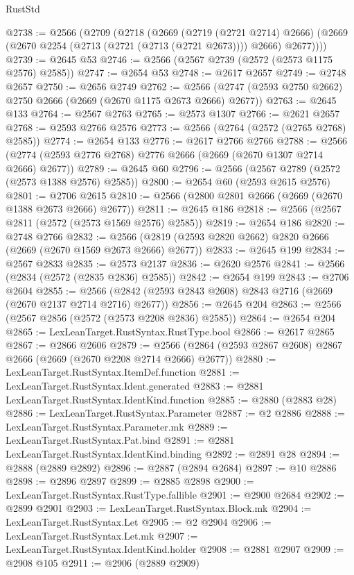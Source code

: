 \begin{lexlean}{RustStd}
\begin{coremodule}
{\begin{coremodule}
{{{{{{{{{{{{{{{{{{{{{{{{{{{{{{{{{{{{{{{{{{{{{{{{{{{{{{{{{{{{{{{{{{{{{{{{{{{{{{@2738 := @2566
    (@2709
      (@2718
        (@2669
          (@2719 (@2721 @2714) @2666)
          (@2669 (@2670 @2254 (@2713 (@2721 (@2713 (@2721 @2673)))) @2666) @2677))))
@2739 := @2645 @53
@2746 := @2566 (@2567 @2739 (@2572 (@2573 @1175 @2576) @2585))
@2747 := @2654 @53
@2748 := @2617 @2657
@2749 := @2748 @2657
@2750 := @2656 @2749
@2762 := @2566 (@2747 (@2593 @2750 @2662) @2750 @2666 (@2669 (@2670 @1175 @2673 @2666) @2677))
@2763 := @2645 @133
@2764 := @2567 @2763
@2765 := @2573 @1307
@2766 := @2621 @2657
@2768 := @2593 @2766 @2576
@2773 := @2566 (@2764 (@2572 (@2765 @2768) @2585))
@2774 := @2654 @133
@2776 := @2617 @2766 @2766
@2788 := @2566 (@2774 (@2593 @2776 @2768) @2776 @2666 (@2669 (@2670 @1307 @2714 @2666) @2677))
@2789 := @2645 @60
@2796 := @2566 (@2567 @2789 (@2572 (@2573 @1388 @2576) @2585))
@2800 := @2654 @60 (@2593 @2615 @2576)
@2801 := @2706 @2615
@2810 := @2566 (@2800 @2801 @2666 (@2669 (@2670 @1388 @2673 @2666) @2677))
@2811 := @2645 @186
@2818 := @2566 (@2567 @2811 (@2572 (@2573 @1569 @2576) @2585))
@2819 := @2654 @186
@2820 := @2748 @2766
@2832 := @2566 (@2819 (@2593 @2820 @2662) @2820 @2666 (@2669 (@2670 @1569 @2673 @2666) @2677))
@2833 := @2645 @199
@2834 := @2567 @2833
@2835 := @2573 @2137
@2836 := @2620 @2576
@2841 := @2566 (@2834 (@2572 (@2835 @2836) @2585))
@2842 := @2654 @199
@2843 := @2706 @2604
@2855 := @2566 (@2842 (@2593 @2843 @2608) @2843 @2716 (@2669 (@2670 @2137 @2714 @2716) @2677))
@2856 := @2645 @204
@2863 := @2566 (@2567 @2856 (@2572 (@2573 @2208 @2836) @2585))
@2864 := @2654 @204
@2865 := LexLeanTarget.RustSyntax.RustType.bool
@2866 := @2617 @2865
@2867 := @2866 @2606
@2879 := @2566 (@2864 (@2593 @2867 @2608) @2867 @2666 (@2669 (@2670 @2208 @2714 @2666) @2677))
@2880 := LexLeanTarget.RustSyntax.ItemDef.function
@2881 := LexLeanTarget.RustSyntax.Ident.generated
@2883 := @2881 LexLeanTarget.RustSyntax.IdentKind.function
@2885 := @2880 (@2883 @28)
@2886 := LexLeanTarget.RustSyntax.Parameter
@2887 := @2 @2886
@2888 := LexLeanTarget.RustSyntax.Parameter.mk
@2889 := LexLeanTarget.RustSyntax.Pat.bind
@2891 := @2881 LexLeanTarget.RustSyntax.IdentKind.binding
@2892 := @2891 @28
@2894 := @2888 (@2889 @2892)
@2896 := @2887 (@2894 @2684)
@2897 := @10 @2886
@2898 := @2896 @2897
@2899 := @2885 @2898
@2900 := LexLeanTarget.RustSyntax.RustType.fallible
@2901 := @2900 @2684
@2902 := @2899 @2901
@2903 := LexLeanTarget.RustSyntax.Block.mk
@2904 := LexLeanTarget.RustSyntax.Let
@2905 := @2 @2904
@2906 := LexLeanTarget.RustSyntax.Let.mk
@2907 := LexLeanTarget.RustSyntax.IdentKind.holder
@2908 := @2881 @2907
@2909 := @2908 @105
@2911 := @2906 (@2889 @2909)
}}}}}}}}}}}}}}}}}}}}}}}}}}}}}}}}}}}}}}}}}}}}}}}}}}}}}}}}}}}}}}}}}}}}}}}}}}}}}}
\end{coremodule}}
\end{coremodule}
\end{lexlean}
